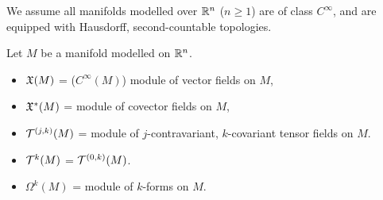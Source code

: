 \documentclass[../main-v2-manifolds.tex]{subfiles}
\begin{document}
\graphicspath{{../images/}{images/}} 
\begin{remark}
    We assume all manifolds modelled over ${\mathbb{R}^n}$ ($n\geq 1$) are of class $C^\infty$, and are equipped with Hausdorff, second-countable topologies.
\end{remark}
Let $M$ be a manifold modelled on ${\mathbb{R}^n}$.
\begin{multicols}{2}
\begin{itemize}
    \item $\mathfrak{X}(M)$ = ($C^\infty(M)$) module of vector fields on $M$,
    \item $\mathfrak{X}^*(M)$ = module of covector fields on $M$,
    \item $\mathcal{T}^{(j,k)}(M)$ = module of $j$-contravariant, $k$-covariant tensor fields on $M$.
    \item $\mathcal{T}^{k}(M)$ = $\mathcal{T}^{(0,k)}(M)$.
    \item $\Omega^k(M)$ = module of $k$-forms on $M$.
\end{itemize}
\end{multicols}
\end{document}
